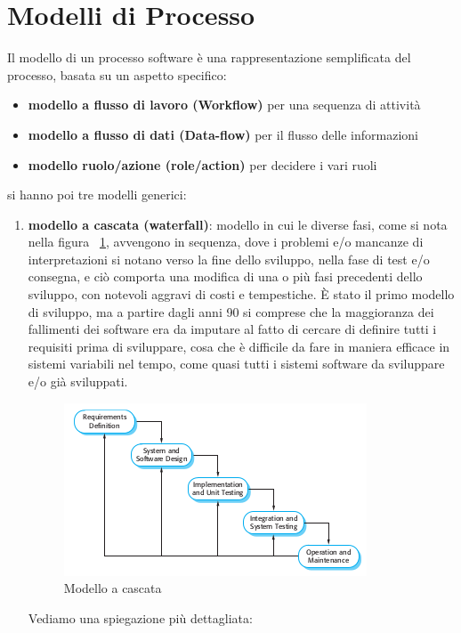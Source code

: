 \documentclass[a4paper,12pt, oneside]{book}
\begin{document}
\section{Modelli di Processo}
Il modello di un processo software è una rappresentazione semplificata del processo, basata su un aspetto specifico:
\begin{itemize}
	\item \textbf{modello a flusso di lavoro (Workflow)} per una sequenza di attività
	\item \textbf{modello a flusso di dati (Data-flow)} per il flusso delle informazioni
	\item \textbf{modello ruolo/azione (role/action)} per decidere i vari ruoli
\end{itemize}
si hanno poi tre modelli generici:
\begin{enumerate}
    \item \textbf{modello a cascata (waterfall)}: modello in cui le diverse fasi, come si nota nella figura \figurename~\ref{fig:wf},
        avvengono  in sequenza, dove i problemi e/o mancanze di interpretazioni si notano verso 
        la fine dello sviluppo, nella fase di test e/o consegna, e ciò comporta una modifica di una 
        o più fasi precedenti dello sviluppo, con notevoli aggravi di costi e tempestiche.\newline
        È stato il primo modello di sviluppo, ma a partire dagli anni 90 si comprese che la 
        maggioranza dei fallimenti dei software era da imputare al fatto di cercare di definire tutti
        i requisiti prima di sviluppare, cosa che è difficile da fare in maniera efficace in sistemi 
        variabili nel tempo, come quasi tutti i sistemi software da sviluppare e/o già sviluppati.
        \begin{figure}
        	\centering
        	\includegraphics[scale=0.7]{img/wf.png}
        	\caption{Modello a cascata \label{fig:wf} }
        \end{figure}
        Vediamo una spiegazione più dettagliata:
        \begin{itemize}

\end{itemize}
\end{enumerate}
\end{document}

